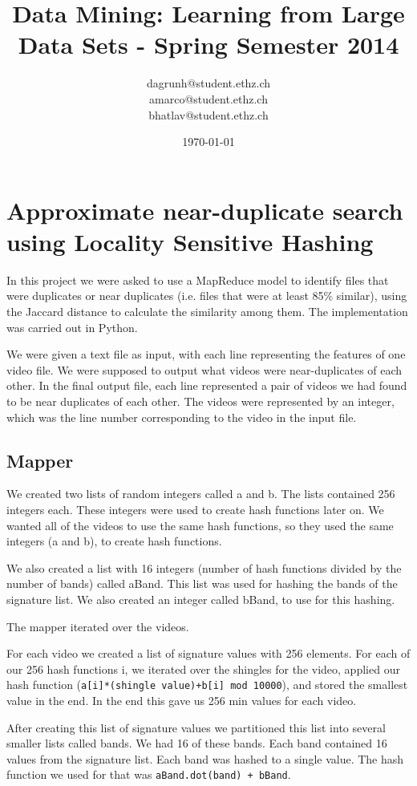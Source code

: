 \documentclass[a4paper, 11pt]{article}
\title{Data Mining: Learning from Large Data Sets - Spring Semester 2014}
\author{dagrunh@student.ethz.ch\\ amarco@student.ethz.ch\\ bhatlav@student.ethz.ch\\}
\date{\today}
\begin{document}
\maketitle

\section*{Approximate near-duplicate search using Locality Sensitive
Hashing}

In this project we were asked to use a MapReduce model to identify files that were duplicates or near duplicates (i.e. files that were at least 85\% similar), using the Jaccard distance to calculate the similarity among them. The implementation was carried out in Python.

We were given a text file as input, with each line representing the features of one video file. We were supposed to output what videos were near-duplicates of each other. In the final output file, each line represented a pair of videos we had found to be near duplicates of each other. The videos were represented by an integer, which was the line number corresponding to the video in the input file.

\subsection*{Mapper}
We created two lists of random integers called a and b. The lists contained 256 integers each. These integers were used to create hash functions later on. We wanted all of the videos to use the same hash functions, so they used the same integers (a and b), to create hash functions.

We also created a list with 16 integers (number of hash functions divided by the number of bands) called aBand. This list was used for hashing the bands of the signature list. We also created an integer called bBand, to use for this hashing.

The mapper iterated over the videos.

For each video we created a list of signature values with 256 elements. For each of our 256 hash functions i, we iterated over the shingles for the video, applied our hash function (\texttt{a[i]*(shingle value)+b[i] mod 10000}), and stored the smallest value in the end. In the end this gave us 256 min values for each video.

After creating this list of signature values we partitioned this list into several smaller lists called bands. We had 16 of these bands. Each band contained 16 values from the signature list. Each band was hashed to a single value. The hash function we used for that was \texttt{aBand.dot(band) + bBand}.
\end{document}

